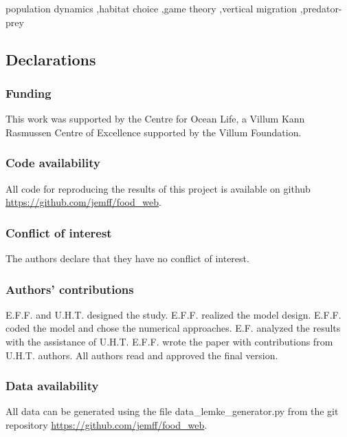 \documentclass[review,authoryear]{elsarticle}
\begin{document}
\begin{keyword} population dynamics \sep habitat choice \sep game theory \sep vertical migration \sep predator-prey %
\end{keyword}


\maketitle



\linenumbers{}
\modulolinenumbers[3]






%
\subsection*{Declarations}
\subsubsection*{Funding}
This work was supported by the Centre for Ocean Life,
a Villum Kann Rasmussen Centre of Excellence supported
by the Villum Foundation.
\subsubsection*{Code availability}
All code for reproducing the results of this project is available on github \url{https://github.com/jemff/food_web}.
\subsubsection*{Conflict of interest}
The authors declare that they have no conflict of interest.
\subsubsection*{Authors' contributions}
E.F.F. and U.H.T. designed the study. E.F.F. realized the model design. E.F.F. coded the model and chose the numerical approaches. E.F. analyzed the results with the assistance of U.H.T.  E.F.F. wrote the paper with contributions from U.H.T. authors. All authors read and approved the final version.
\subsubsection*{Data availability}
All data can be generated using the file data\_lemke\_generator.py  from the git repository \url{https://github.com/jemff/food_web}.





\appendix

\end{document}
